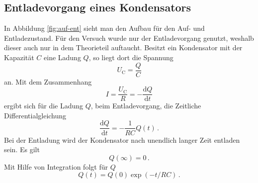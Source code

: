 \subsection{Entladevorgang eines Kondensators}
In Abbildung \ref{fig:auf-ent} sieht man den Aufbau für den Auf- und Entladezustand.
Für den Versuch wurde nur der Entladevorgang genutzt, weshalb dieser auch nur in dem Theorieteil auftaucht.
Besitzt ein Kondensator mit der Kapazität $C$ eine Ladung $Q$, so liegt dort die Spannung 
\begin{equation*}
    U_\text{C}=\frac{Q}{C}
\end{equation*}
an. Mit dem Zusammenhang
\begin{equation*}
    I=\frac{U_\text{C}}{R}=- \frac{\text{d}Q}{\text{d}t}
\end{equation*}
ergibt sich für die Ladung $Q$, beim Entladevorgang, die Zeitliche Differentialgleichung
\begin{equation}
    \label{eqn:Q-DGL}
    \frac{\text{d}Q}{\text{d}t}=-\frac{1}{RC}Q(t)\, .
\end{equation}
Bei der Entladung wird der Kondensator nach unendlich langer Zeit entladen sein. Es gilt
\begin{equation*}
    Q(\infty)=0\, .
\end{equation*}
Mit Hilfe von Integration folgt für $Q$
\begin{equation}
    Q(t)=Q(0)\exp(-t/RC)\, .
\end{equation}
